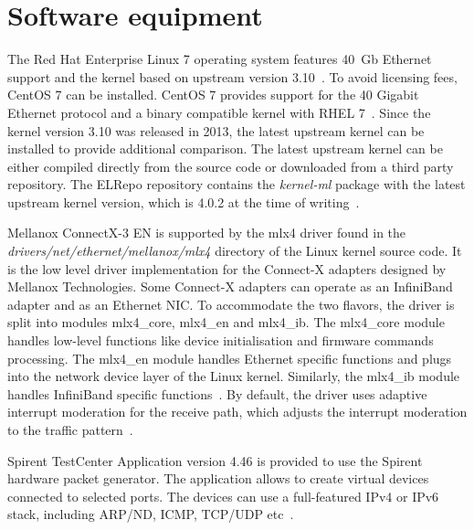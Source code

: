 
\section{Software equipment}\label{sec:analysis-software}
The Red Hat Enterprise Linux 7 operating system features 40~Gb Ethernet support and
the kernel based on upstream version 3.10~\cite{rhel-7-announce}.
To avoid licensing fees, CentOS 7 can be installed.
CentOS 7 provides support for the 40 Gigabit Ethernet protocol and a binary compatible kernel with RHEL 7~\cite{centos-7-announce}.
Since the kernel version 3.10 was released in 2013, the latest upstream kernel can be installed
to provide additional comparison.
The latest upstream kernel can be either compiled directly from the source code or downloaded from a third party repository.
The ELRepo repository contains the {\it{kernel-ml}} package
with the latest upstream kernel version, which is 4.0.2 at the time of writing~\cite{elrepo-kernel-ml}.

Mellanox ConnectX-3 EN is supported by the mlx4 driver found in the
{\it{drivers/net/ethernet/mellanox/mlx4}} directory of the Linux kernel source code.
It is the low level driver implementation for the Connect-X adapters designed by Mellanox Technologies.
Some Connect-X adapters can operate as an InfiniBand adapter and as an Ethernet NIC.
To accommodate the two flavors, the driver is split into modules mlx4\_core, mlx4\_en and mlx4\_ib.
The mlx4\_core module handles low-level functions like device initialisation and firmware commands processing.
The mlx4\_en module handles Ethernet specific functions and
plugs into the network device layer of the Linux kernel.
Similarly, the mlx4\_ib module handles InfiniBand specific functions~\cite{mellanox-user-manual}.
By default, the driver uses adaptive interrupt moderation for the receive path,
which adjusts the interrupt moderation to the traffic pattern~\cite{mellanox-user-manual}.

Spirent TestCenter Application version 4.46 is provided to use the Spirent hardware packet generator.
The application allows to create virtual devices connected to selected ports.
The devices can use a full-featured IPv4 or IPv6 stack, including ARP/ND, ICMP, TCP/UDP etc~\cite{spirent-app}.
